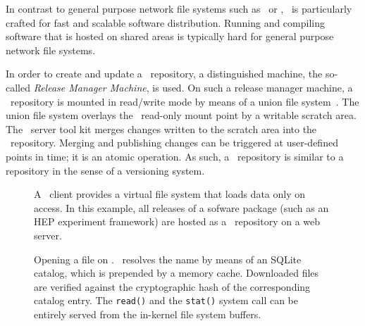 In contrast to general purpose network file systems such as \nfs\ or \afs, \cvmfs\ is particularly crafted for fast and scalable software distribution.
Running and compiling software that is hosted on shared areas is typically hard for general purpose network file systems.

In order to create and update a \cvmfs\ repository, a distinguished machine, the so-called \emph{Release Manager Machine}, is used.
On such a release manager machine, a \cvmfs\ repository is mounted in read/write mode by means of a union file system~\cite{unionfs04}.
The union file system overlays the \cvmfs\ read-only mount point by a writable scratch area.
The \cvmfs\ server tool kit merges changes written to the scratch area into the \cvmfs\ repository.
Merging and publishing changes can be triggered at user-defined points in time; it is an atomic operation.
As such, a \cvmfs\ repository is similar to a repository in the sense of a versioning system.

\begin{figure}
	\begin{center}
		\resizebox{\textwidth}{!}{}
	\end{center}
	\caption{A \cvmfs\ client provides a virtual file system that loads data only on access.  
		In this example, all releases of a sofware package (such as an HEP experiment framework) are hosted as a \cvmfs\ repository on a web server.}
	\label{fig:concept}
\end{figure}

\begin{figure}
	\begin{center}
		
	\end{center}
	\caption{Opening a file on \cvmfs. \cvmfs\ resolves the name by means of an SQLite catalog, which is prepended by a memory cache. 
		Downloaded files are verified against the cryptographic hash of the corresponding catalog entry. 
		The \texttt{read()} and the \texttt{stat()} system call can be entirely served from the in-kernel file system buffers.}
	\label{fig:fuse}
\end{figure}
